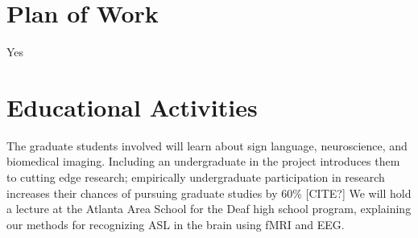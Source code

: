 \documentclass{proposal}
\begin{document}
\section{Plan of Work}

Yes

\section{Educational Activities}

The graduate students involved will learn about sign language, neuroscience, and biomedical imaging. Including an undergraduate in the project introduces them to cutting edge research; empirically undergraduate participation in research increases their chances of pursuing graduate studies by 60\% [CITE?] We will hold a lecture at the Atlanta Area School for the Deaf high school program, explaining our methods for recognizing ASL in the brain using fMRI and EEG.




\end{document}
